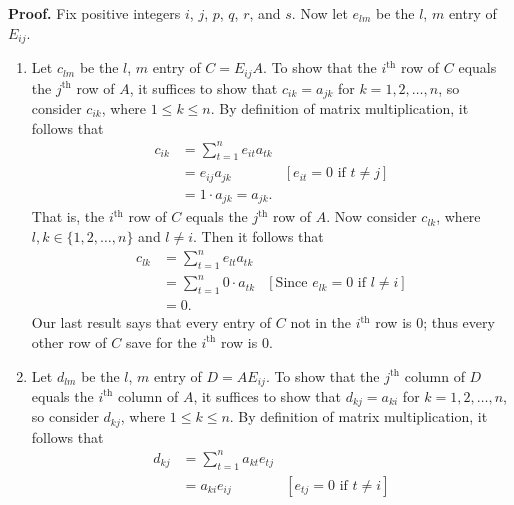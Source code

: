 \begin{enumerate}
      \textbf{Proof.} Fix positive integers $i$, $j$, $p$, $q$, $r$, and $s$.
      Now let $e_{lm}$ be the $l$, $m$ entry of $E_{ij}$.
      \begin{enumerate}
         \item Let $c_{lm}$ be the $l$, $m$ entry of $C = E_{ij}A$. To show that 
               the $i^{\text{th}}$ row of $C$ equals the $j^{\text{th}}$ row of
               $A$, it suffices to show that $c_{ik} = a_{jk}$ for
               $k = 1, 2, \ldots, n$, so consider $c_{ik}$,
               where $1 \le k \le n$. By definition of matrix multiplication, it 
               follows that
               \begin{align*}
                  c_{ik} &= \sum_{t=1}^ne_{it}a_{tk} \\
                         &= e_{ij}a_{jk} &[e_{it} = 0 \text{ if } t \neq j] \\
                         &= 1 \cdot a_{jk} = a_{jk}.
               \end{align*}
               That is, the $i^{\text{th}}$ row of $C$ equals the
               $j^{\text{th}}$ row of $A$. Now consider $c_{lk}$, where
               $l, k \in \{1, 2, \ldots, n\}$ and $l \neq i$. Then it follows
               that
               \begin{align*}
                  c_{lk} &= \sum_{t=1}^ne_{lt}a_{tk} \\
                         &= \sum_{t=1}^n0 \cdot a_{tk} &[\text{Since }e_{lk} = 0
                            \text{ if } l \neq i] \\
                         &= 0.
               \end{align*}
               Our last result says that every entry of $C$ not in the
               $i^{\text{th}}$ row is 0; thus every other row of $C$ save for
               the $i^{\text{th}}$ row is 0.
         \item Let $d_{lm}$ be the $l$, $m$ entry of $D = AE_{ij}$. To show that 
               the $j^{\text{th}}$ column of $D$ equals the $i^{\text{th}}$
               column of $A$, it suffices to show that $d_{kj} = a_{ki}$ for
               $k = 1, 2, \ldots, n$, so consider $d_{kj}$,
               where $1 \le k \le n$. By definition of matrix multiplication, it 
               follows that
               \begin{align*}
                  d_{kj} &= \sum_{t=1}^na_{kt}e_{tj} \\
                         &= a_{ki}e_{ij} &[e_{tj} = 0 \text{ if } t \neq i] \\

\end{align*}
\end{enumerate}
\end{enumerate}

